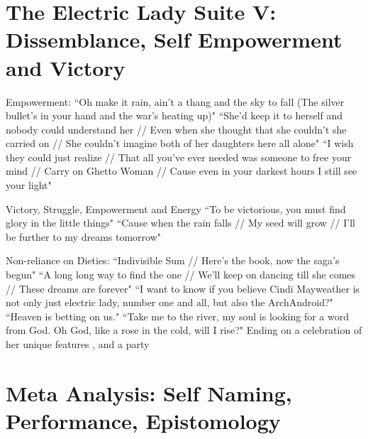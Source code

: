\documentclass[a4paper, 11pt]{article} %
\begin{document}
\section*{The Electric Lady Suite V: Dissemblance, Self Empowerment and Victory}

Empowerment: 
``Oh make it rain, ain't a thang and the sky to fall (The silver bullet's in your hand and the war's heating up)" \cite{manymoons}
``She'd keep it to herself and nobody could understand her // Even when she thought that she couldn't she carried on // She couldn't imagine both of her daughters here all alone"\cite{ghettowoman}
``I wish they could just realize // That all you've ever needed was someone to free your mind // Carry on Ghetto Woman // Cause even in your darkest hours I still see your light" \cite{ghettowoman}

Victory, Struggle, Empowerment and Energy
``To be victorious, you must find glory in the little things"\cite{victory}
``Cause when the rain falls // My seed will grow // I'll be further to my dreams tomorrow"\cite{victory}


Non-reliance on Dieties:
``Indivisible Sum // Here's the book, now the saga's begun"\cite{fiveseveneighttwoone}
``A long long way to find the one // We'll keep on dancing till she comes // These dreams are forever"\cite{danceordie}
``I want to know if you believe Cindi Mayweather is not only just electric lady, number one and all, but also the ArchAndroid?"\cite{favoritefugitive}
``Heaven is betting on us."\cite{primetime}
``Take me to the river, my soul is looking for a word from God. Oh God, like a rose in the cold, will I rise?"\cite{sallyride}
Ending on a celebration of her unique features \cite{dandridgeeyes}, and a party\cite{whatanexperience}


\section*{Meta Analysis: Self Naming, Performance, Epistomology}
\end{document}
